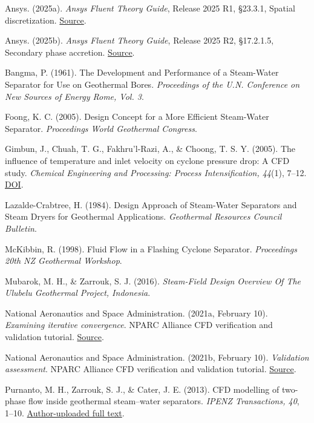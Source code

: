 Ansys. (2025a). \emph{Ansys Fluent Theory Guide}, Release 2025 R1, §23.3.1, Spatial discretization. \href{https://ansyshelp.ansys.com/public/Views/Secured/corp/v251/en/flu_th/flu_th_SolveDiscretization_spatial.html}{Source}.

Ansys. (2025b). \emph{Ansys Fluent Theory Guide}, Release 2025 R2, §17.2.1.5, Secondary phase accretion. \href{https://ansyshelp.ansys.com/public/Views/Secured/corp/v252/en/flu_th/flu_th_ewf_sec_film_submodels.html}{Source}.

Bangma, P. (1961). The Development and Performance of a Steam-Water Separator for Use on Geothermal Bores. \emph{Proceedings of the U.N. Conference on New Sources of Energy Rome, Vol. 3}.

Foong, K. C. (2005). Design Concept for a More Efficient Steam-Water Separator. \emph{Proceedings World Geothermal Congress}.

Gimbun, J., Chuah, T. G., Fakhru'l-Razi, A., \& Choong, T. S. Y. (2005). The influence of temperature and inlet velocity on cyclone pressure drop: A CFD study. \emph{Chemical Engineering and Processing: Process Intensification, 44}(1), 7--12. \href{https://doi.org/10.1016/j.cep.2004.03.005}{DOI}.

Lazalde-Crabtree, H. (1984). Design Approach of Steam-Water Separators and Steam Dryers for Geothermal Applications. \emph{Geothermal Resources Council Bulletin}.

McKibbin, R. (1998). Fluid Flow in a Flashing Cyclone Separator. \emph{Proceedings 20th NZ Geothermal Workshop}.

Mubarok, M. H., \& Zarrouk, S. J. (2016). \emph{Steam-Field Design Overview Of The Ulubelu Geothermal Project, Indonesia}.

National Aeronautics and Space Administration. (2021a, February 10). \emph{Examining iterative convergence}. NPARC Alliance CFD verification and validation tutorial. \href{https://www.grc.nasa.gov/www/wind/valid/tutorial/iterconv.html}{Source}.

National Aeronautics and Space Administration. (2021b, February 10). \emph{Validation assessment}. NPARC Alliance CFD verification and validation tutorial. \href{https://www.grc.nasa.gov/www/wind/valid/tutorial/valassess.html}{Source}.

Purnanto, M. H., Zarrouk, S. J., \& Cater, J. E. (2013). CFD modelling of two-phase flow inside geothermal steam--water separators. \emph{IPENZ Transactions, 40}, 1--10. \href{https://www.researchgate.net/publication/269519626_CFD_MODELLING_OF_TWO-PHASE_FLOW_INSIDE_GEOTHERMAL_STEAM-WATER_SEPARATORS}{Author-uploaded full text}.

